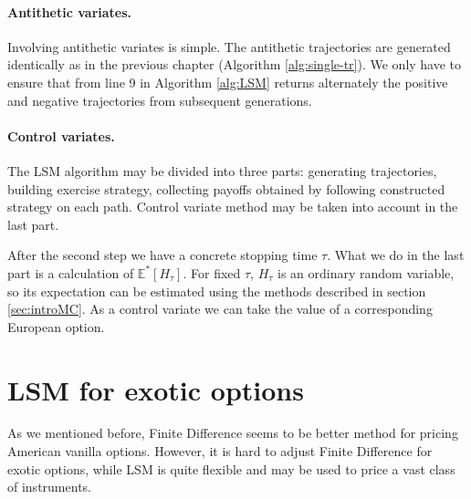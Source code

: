 \documentclass[a4paper,11pt, twoside]{book}
\theoremstyle{definition}
\theoremstyle{remark}
\def\Em{{\mathbb{E}^*}}
\begin{document}
\paragraph{Antithetic variates.} Involving antithetic variates is simple. The antithetic trajectories are generated identically as in the previous chapter (Algorithm \ref{alg:single-tr}). We only have to ensure that  from line 9 in Algorithm \ref{alg:LSM} returns alternately the positive and negative trajectories from subsequent generations. 

\paragraph{Control variates.} The LSM algorithm may be divided into three parts: generating trajectories, building exercise strategy, collecting payoffs obtained by following constructed strategy on each path. Control variate method may be taken into account in the last part. 

After the second step we have a concrete stopping time $\tau$. What we do in the last part is a calculation of $\Em[H_\tau]$. For fixed $\tau$, $H_\tau$ is an ordinary random variable, so its expectation can be estimated using the methods described in section \ref{sec:introMC}. As a control variate we can take the value of a corresponding European option.

\section{LSM for exotic options}
As we mentioned before, Finite Difference seems to be better method for pricing American vanilla options. However, it is hard to adjust Finite Difference for exotic options, while LSM is quite flexible and may be used to price a vast class of instruments.
\end{document}
